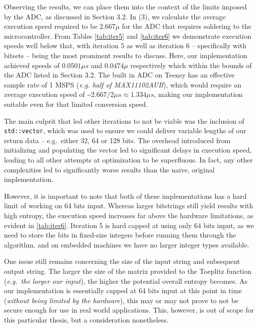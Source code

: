 \documentclass{sigchi}
\begin{document}
Observing the results, we can place them into the context of the limits imposed by the ADC, as discussed in Section 3.2. In (3), we calculate the average execution speed required to be \(2.667 \mu\) for the ADC that requires soldering to the microcontroller. From Tables \ref{tab:iter5} and \ref{tab:iter6} we demonstrate execution speeds well below that, with iteration 5 as well as iteration 6 -- specifically with bitsets -- being the most prominent results to discuss. Here, our implementation achieved speeds of \(0.0501 \mu s\) and \(0.0474 \mu\) respectively which within the bounds of the ADC listed in Section 3.2. The built in ADC on Teensy has an effective sample rate of 1 MSPS (\emph{e.g. half of MAX11102AUB}), which would require an average execution speed of \textasciitilde{}\(2.667/2 \mu s \approx 1.334 \mu s\), making our implementation suitable even for that limited conversion speed.

The main culprit that led other iterations to not be viable was the inclusion of \texttt{std::vector}, which was used to ensure we could deliver variable lengths of our return data -- e.g.~either 32, 64 or 128 bits. The overhead introduced from initializing and populating the vector led to significant delays in execution speed, leading to all other attempts at optimization to be superfluous. In fact, any other complexities led to significantly worse results than the naive, original implementation.

However, it is important to note that both of these implementations has a hard limit of working on 64 bits input. Whereas larger bitstrings still yield results with high entropy, the execution speed increases far above the hardware limitations, as evident in \ref{tab:iter6}. Iteration 5 is hard capped at using only 64 bits input, as we need to store the bits in fixed-size integers before running them through the algorithm, and on embedded machines we have no larger integer types available.

One issue still remains concerning the size of the input string and subsequent output string. The larger the size of the matrix provided to the Toeplitz function (\emph{e.g.~the larger our input}), the higher the potential overall entropy becomes. As our implementation is essentially capped at 64 bits input at this point in time (\emph{without being limited by the hardware}), this may or may not prove to not be secure enough for use in real world applications. This, however, is out of scope for this particular thesis, but a consideration nonetheless.
\end{document}
